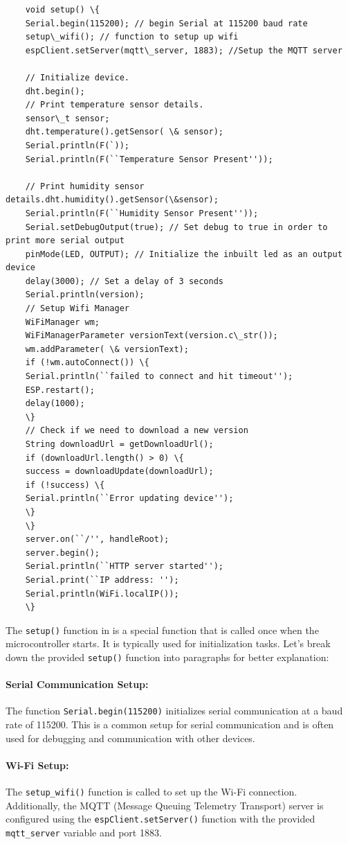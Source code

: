 \begin{lstlisting}
	void setup() \{
	Serial.begin(115200); // begin Serial at 115200 baud rate
	setup\_wifi(); // function to setup up wifi
	espClient.setServer(mqtt\_server, 1883); //Setup the MQTT server
	
	// Initialize device.
	dht.begin();
	// Print temperature sensor details.
	sensor\_t sensor;
	dht.temperature().getSensor( \& sensor);
	Serial.println(F(`));
	Serial.println(F(``Temperature Sensor Present''));
	
	// Print humidity sensor details.dht.humidity().getSensor(\&sensor);
	Serial.println(F(``Humidity Sensor Present''));
	Serial.setDebugOutput(true); // Set debug to true in order to print more serial output
	pinMode(LED, OUTPUT); // Initialize the inbuilt led as an output device
	delay(3000); // Set a delay of 3 seconds 
	Serial.println(version);
	// Setup Wifi Manager
	WiFiManager wm;
	WiFiManagerParameter versionText(version.c\_str());
	wm.addParameter( \& versionText);
	if (!wm.autoConnect()) \{
	Serial.println(``failed to connect and hit timeout'');
	ESP.restart();
	delay(1000);
	\}
	// Check if we need to download a new version
	String downloadUrl = getDownloadUrl();
	if (downloadUrl.length() > 0) \{
	success = downloadUpdate(downloadUrl);
	if (!success) \{
	Serial.println(``Error updating device'');
	\}
	\}
	server.on(``/'', handleRoot);
	server.begin();
	Serial.println(``HTTP server started'');
	Serial.print(``IP address: '');
	Serial.println(WiFi.localIP());
	\}

\end{lstlisting}
	


The \texttt{setup()} function in is a special function that is called once when the microcontroller starts. It is typically used for initialization tasks. Let's break down the provided \texttt{setup()} function into paragraphs for better explanation:

\paragraph{Serial Communication Setup:}
The function \texttt{Serial.begin(115200)} initializes serial communication at a baud rate of 115200. This is a common setup for serial communication and is often used for debugging and communication with other devices.

\paragraph{Wi-Fi Setup:}
The \texttt{setup\_wifi()} function is called to set up the Wi-Fi connection. Additionally, the MQTT (Message Queuing Telemetry Transport) server is configured using the \texttt{espClient.setServer()} function with the provided \texttt{mqtt\_server} variable and port 1883.

